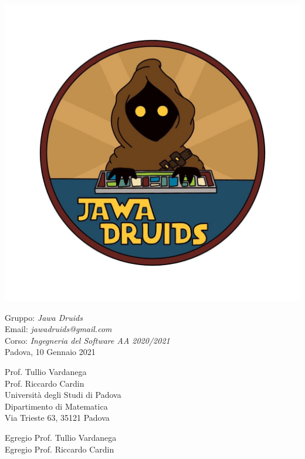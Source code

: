 \documentclass[a4paper,12pt]{report}
\begin{document}
\mbox{}
\vspace{-4cm}
\begin{center}
  \includegraphics[width=0.6\linewidth]{immagini/DRUIDSLOGO.jpg}
\end{center}
Gruppo: \textit{Jawa Druids} \\ Email: \textit{jawadruids@gmail.com}\\ Corso: \textit{Ingegneria del Software AA 2020/2021}\\Padova, 10 Gennaio 2021 \\
\begin{flushright}
  Prof. Tullio Vardanega \\
  Prof. Riccardo Cardin \\
  Università degli Studi di Padova \\
  Dipartimento di Matematica \\
  Via Trieste 63, 35121 Padova \\
\end{flushright}
Egregio Prof. Tullio Vardanega \\
Egregio Prof. Riccardo Cardin \\
\vspace{0.2cm}
\end{document}
